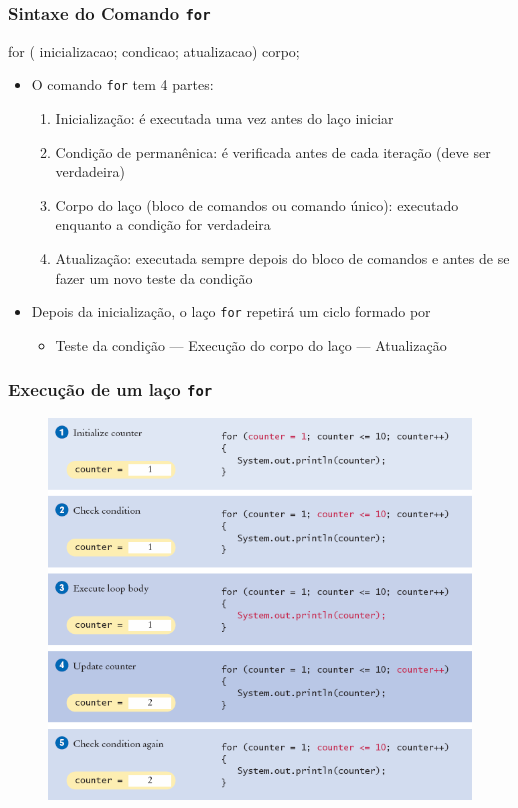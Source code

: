 \documentclass[xcolor={dvipsnames,table},aspectratio=169]{beamer}
\begin{document}
\begin{frame}[fragile]\frametitle{Sintaxe do Comando \texttt{for}}
\begin{javacode}
for ( inicializacao; condicao; atualizacao)
    corpo;
\end{javacode}
\begin{itemize}
    \item O comando \texttt{for} tem 4 partes:
    \begin{enumerate}
        \item Inicialização: é executada uma vez antes do laço iniciar
        \item Condição de permanênica: é verificada antes de cada iteração (deve ser verdadeira)
        \item Corpo do laço (bloco de comandos ou comando único): executado enquanto a condição for verdadeira
        \item Atualização: executada sempre depois do bloco de comandos e antes de se fazer um novo teste da condição
    \end{enumerate}
    \item Depois da inicialização, o laço \texttt{for} repetirá um ciclo formado por
    \begin{itemize}
        \item Teste da condição --- Execução do corpo do laço --- Atualização
    \end{itemize}
\end{itemize}
\end{frame}

\begin{frame}\frametitle{Execução de um laço \texttt{for}}
\begin{figure}[h]
	\includegraphics[height=0.70\paperheight,center]{pucrs-ep-fprog-unidade_04-lacos-laminas-execucao_do_laco_for.png}
\end{figure}
\end{frame}
\end{document}
